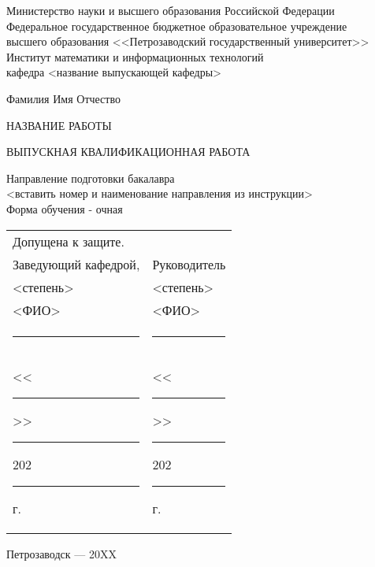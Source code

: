 { \large
\begin{center}
\renewcommand{\baselinestretch}{1.4}
Министерство науки и высшего образования Российской Федерации\\
\bigskip
Федеральное государственное бюджетное образовательное учреждение \\ 
высшего образования <<Петрозаводский государственный университет>>\\
\bigskip
Институт математики и информационных технологий \\
кафедра <название выпускающей кафедры>

\end{center}
\vspace{3\bigskipamount}%

\vspace{3\bigskipamount}

\begin{center}
\large
Фамилия Имя Отчество
\end{center}
\medskip%

\begin{center}
\renewcommand{\baselinestretch}{1.2}
\Large НАЗВАНИЕ РАБОТЫ
\end{center}
\medskip%


\begin{center}
\large
ВЫПУСКНАЯ КВАЛИФИКАЦИОННАЯ РАБОТА
\end{center}
\medskip%

\begin{center}
\large
Направление подготовки бакалавра \\
<вставить номер и наименование направления из инструкции> \\
Форма обучения - очная
\end{center}

\vspace{4\bigskipamount}%

\begin{tabular}{ l l }
	
	Допущена к защите. & \\
	Заведующий кафедрой, & \hspace{2cm} Руководитель\\
	<степень> &  \hspace{2cm} <степень> \\
	<ФИО> &  \hspace{2cm} <ФИО> \\
	\noindent\rule{6cm}{0.2pt} &  \hspace{2cm} \noindent\rule{6cm}{0.2pt} \\
	<<\noindent\rule{1cm}{0.2pt}>>\noindent\rule{3cm}{0.2pt}202\noindent\rule{0.3cm}{0.2pt} г. &  \hspace{2cm}
  <<\noindent\rule{1cm}{0.2pt}>>\noindent\rule{3cm}{0.2pt}202\noindent\rule{0.3cm}{0.2pt} г.
  \\
\end{tabular}

\vfill%

\begin{center}
\large
Петрозаводск --- 20XX
\end{center}
}
